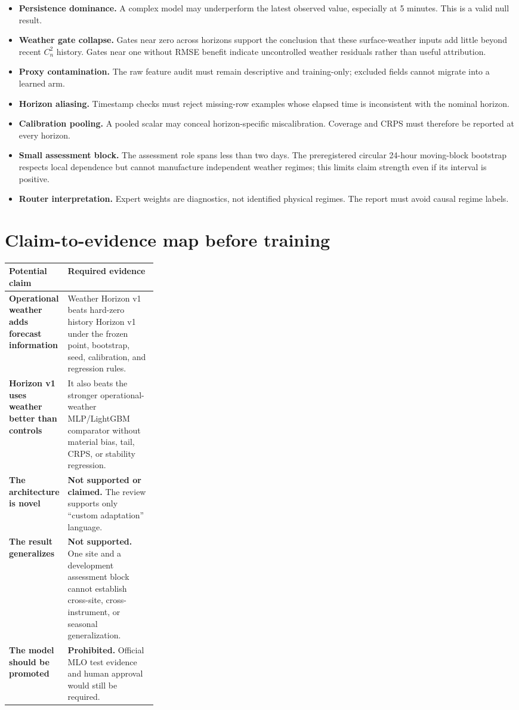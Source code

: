 \documentclass[10pt]{article}
\newcommand{\cn}{\(C_n^2\)}
\begin{document}
\begin{itemize}
\item \textbf{Persistence dominance.} A complex model may underperform the
latest observed value, especially at 5 minutes. This is a valid null result.
\item \textbf{Weather gate collapse.} Gates near zero across horizons support
the conclusion that these surface-weather inputs add little beyond recent
\cn{} history. Gates near one without RMSE benefit indicate uncontrolled
weather residuals rather than useful attribution.
\item \textbf{Proxy contamination.} The raw feature audit must remain
descriptive and training-only; excluded fields cannot migrate into a learned
arm.
\item \textbf{Horizon aliasing.} Timestamp checks must reject missing-row
examples whose elapsed time is inconsistent with the nominal horizon.
\item \textbf{Calibration pooling.} A pooled scalar may conceal
horizon-specific miscalibration. Coverage and CRPS must therefore be reported
at every horizon.
\item \textbf{Small assessment block.} The assessment role spans less than two
days. The preregistered circular 24-hour moving-block bootstrap respects local
dependence but cannot manufacture independent weather regimes; this limits
claim strength even if its interval is positive.
\item \textbf{Router interpretation.} Expert weights are diagnostics, not
identified physical regimes. The report must avoid causal regime labels.
\end{itemize}

\section{Claim-to-evidence map before training}

\begin{tabularx}{\linewidth}{>{\bfseries}p{0.29\linewidth}X}
\toprule
Potential claim & Required evidence\\
\midrule
Operational weather adds forecast information
& Weather Horizon v1 beats hard-zero history Horizon v1 under the frozen
point, bootstrap, seed, calibration, and regression rules.\\
Horizon v1 uses weather better than controls
& It also beats the stronger operational-weather MLP/LightGBM comparator
without material bias, tail, CRPS, or stability regression.\\
The architecture is novel
& \textbf{Not supported or claimed.} The review supports only ``custom
adaptation'' language.\\
The result generalizes
& \textbf{Not supported.} One site and a development assessment block cannot
establish cross-site, cross-instrument, or seasonal generalization.\\
The model should be promoted
& \textbf{Prohibited.} Official MLO test evidence and human approval would
still be required.\\
\bottomrule
\end{tabularx}
\end{document}
